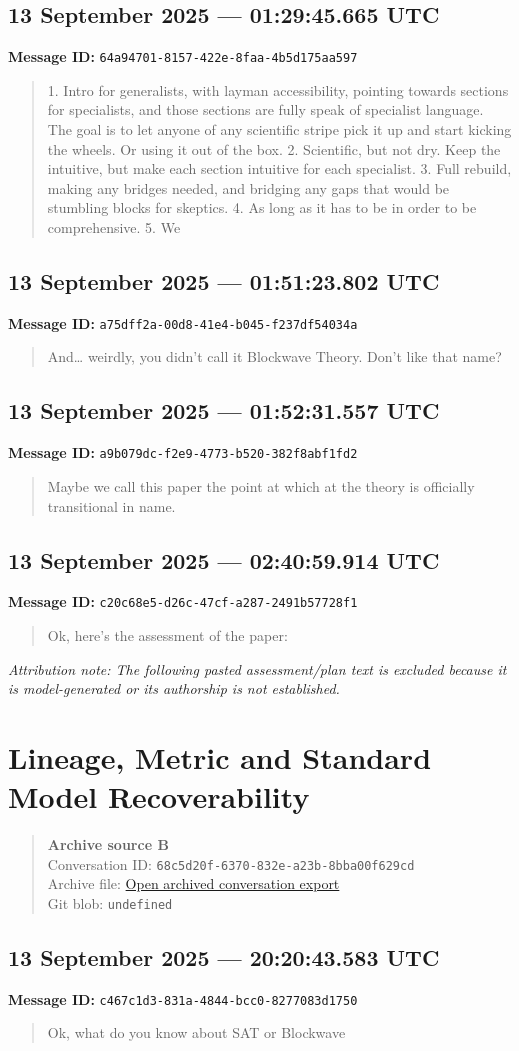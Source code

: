 \documentclass[11pt,letterpaper]{article}
\newcommand{\messageentry}[3]{%
  \Needspace{7\baselineskip}
  \subsection*{#1}
  {\small\textbf{Message ID:} \texttt{#2}}
  \vspace{2pt}
}
\newcommand{\sourceblock}[4]{%
  \begin{quote}\small
  \textbf{#1}\\
  Conversation ID: \texttt{#2}\\
  Archive file: \href{#3}{Open archived conversation export}\\
  Git blob: \texttt{#4}
  \end{quote}
}
\begin{document}
\messageentry{13 September 2025 --- 01:29:45.665 UTC}{64a94701-8157-422e-8faa-4b5d175aa597}{}
\begin{quote}\small
1. Intro for generalists, with layman accessibility, pointing towards sections for specialists, and those sections are fully speak of specialist language. The goal is to let anyone of any scientific stripe pick it up and start kicking the wheels. Or using it out of the box. 2. Scientific, but not dry. Keep the intuitive, but make each section intuitive for each specialist. 3. Full rebuild, making any bridges needed, and bridging any gaps that would be stumbling blocks for skeptics. 4. As long as it has to be in order to be comprehensive. 5. We
\end{quote}

\messageentry{13 September 2025 --- 01:51:23.802 UTC}{a75dff2a-00d8-41e4-b045-f237df54034a}{}
\begin{quote}\small
And… weirdly, you didn’t call it Blockwave Theory. Don’t like that name?
\end{quote}

\messageentry{13 September 2025 --- 01:52:31.557 UTC}{a9b079dc-f2e9-4773-b520-382f8abf1fd2}{}
\begin{quote}\small
Maybe we call this paper the point at which at the theory is officially transitional in name. 
\end{quote}

\messageentry{13 September 2025 --- 02:40:59.914 UTC}{c20c68e5-d26c-47cf-a287-2491b57728f1}{}
\begin{quote}\small
Ok, here’s the assessment of the paper:
\end{quote}
{\small\emph{Attribution note: The following pasted assessment/plan text is excluded because it is model-generated or its authorship is not established.}}

\section*{Lineage, Metric and Standard Model Recoverability}
\sourceblock{Archive source B}{68c5d20f-6370-832e-a23b-8bba00f629cd}{https://github.com/Satobloc/HsH/blob/main/DEVELOPMENT_FULL_CONVOS/SAT_CONVOS_3/25.09.13\%E2\%80\%A225.09.14\%E2\%80\%A2SAT\%20and\%20Blockwave\%20overview\%20\%E2\%80\%94\%20raw.json}{undefined}
\messageentry{13 September 2025 --- 20:20:43.583 UTC}{c467c1d3-831a-4844-bcc0-8277083d1750}{}
\begin{quote}\small
Ok, what do you know about SAT or Blockwave
\end{quote}
\end{document}
